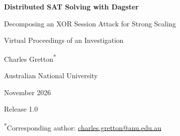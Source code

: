 \documentclass[11pt,a4paper]{article}
\begin{document}
\begin{titlepage}
\centering
\vspace*{3cm}
{\Huge\bfseries Distributed SAT Solving with Dagster\par}
\vspace{0.6cm}
{\Large Decomposing an XOR Session Attack for Strong Scaling\par}
\vspace{1.5cm}
{\Large Virtual Proceedings of an Investigation\par}
\vspace{2cm}
{\large Charles Gretton\textsuperscript{$\ast$}\par}
{\normalsize Australian National University\par}
\vspace{1cm}
{\normalsize November 2026\par}
{\small Release 1.0\par}
\vfill
{\small\textsuperscript{$\ast$}Corresponding author:
\href{mailto:charles.gretton@anu.edu.au}{charles.gretton@anu.edu.au}\par}
\end{titlepage}
\end{document}
